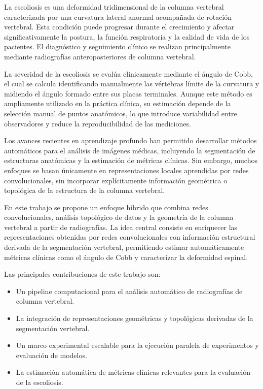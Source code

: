 \documentclass[conference]{IEEEtran}
\begin{document}
La escoliosis es una deformidad tridimensional de la columna vertebral caracterizada por una curvatura lateral anormal acompañada de rotación vertebral. Esta condición puede progresar durante el crecimiento y afectar significativamente la postura, la función respiratoria y la calidad de vida de los pacientes. El diagnóstico y seguimiento clínico se realizan principalmente mediante radiografías anteroposteriores de columna vertebral.

La severidad de la escoliosis se evalúa clínicamente mediante el ángulo de Cobb, el cual se calcula identificando manualmente las vértebras límite de la curvatura y midiendo el ángulo formado entre sus placas terminales. Aunque este método es ampliamente utilizado en la práctica clínica, su estimación depende de la selección manual de puntos anatómicos, lo que introduce variabilidad entre observadores y reduce la reproducibilidad de las mediciones.

Los avances recientes en aprendizaje profundo han permitido desarrollar métodos automáticos para el análisis de imágenes médicas, incluyendo la segmentación de estructuras anatómicas y la estimación de métricas clínicas. Sin embargo, muchos enfoques se basan únicamente en representaciones locales aprendidas por redes convolucionales, sin incorporar explícitamente información geométrica o topológica de la estructura de la columna vertebral.

En este trabajo se propone un enfoque híbrido que combina redes convolucionales, análisis topológico de datos y la geometría de la columna vertebral a partir de radiografías. La idea central consiste en enriquecer las representaciones obtenidas por redes convolucionales con información estructural derivada de la segmentación vertebral, permitiendo estimar automáticamente métricas clínicas como el ángulo de Cobb y caracterizar la deformidad espinal.

Las principales contribuciones de este trabajo son:

\begin{itemize}

\item Un pipeline computacional para el análisis automático de radiografías de columna vertebral.

\item La integración de representaciones geométricas y topológicas derivadas de la segmentación vertebral.

\item Un marco experimental escalable para la ejecución paralela de experimentos y evaluación de modelos.

\item La estimación automática de métricas clínicas relevantes para la evaluación de la escoliosis.

\end{itemize}
\end{document}
